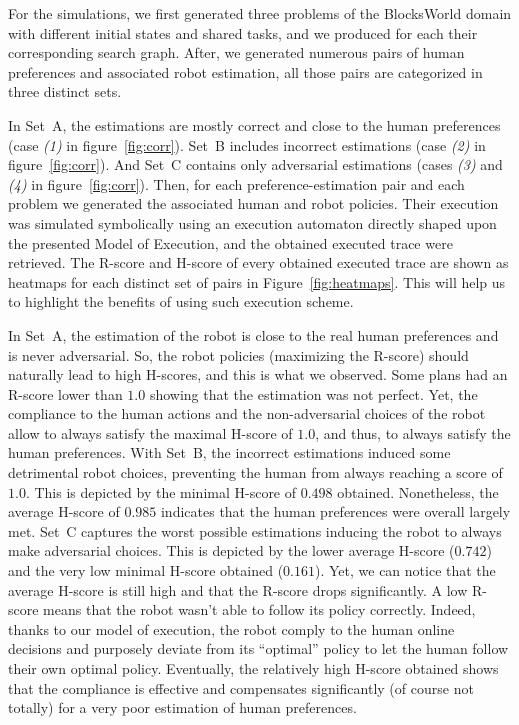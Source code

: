 For the simulations, we first generated three problems of the BlocksWorld domain with different initial states and shared tasks, and we produced for each their corresponding search graph. 
After, we generated numerous pairs of human preferences and associated robot estimation, all those pairs are categorized in three distinct sets.

In Set~A, the estimations are mostly correct and close to the human preferences (case \textit{(1)} in figure~\ref{fig:corr}). Set~B includes incorrect estimations (case \textit{(2)} in figure~\ref{fig:corr}). And Set~C contains only adversarial estimations (cases \textit{(3)} and \textit{(4)} in figure~\ref{fig:corr}).
Then, for each preference-estimation pair and each problem we generated the associated human and robot policies. Their execution was simulated symbolically using an execution automaton directly shaped upon the presented Model of Execution, and the obtained executed trace were retrieved.
The R-score and H-score of every obtained executed trace are shown as heatmaps for each distinct set of pairs in Figure~\ref{fig:heatmaps}. This will help us to highlight the benefits of using such execution scheme.

In Set~A, the estimation of the robot is close to the real human preferences and is never adversarial. So, the robot policies (maximizing the R-score) should naturally lead to high H-scores, and this is what we observed.
Some plans had an R-score lower than $1.0$ showing that the estimation was not perfect. Yet, the compliance to the human actions and the non-adversarial choices of the robot allow to always satisfy the maximal H-score of $1.0$, and thus, to always satisfy the human preferences. 
With Set~B, the incorrect estimations induced some detrimental robot choices, preventing the human from always reaching a score of $1.0$. This is depicted by the minimal H-score of $0.498$ obtained. Nonetheless, the average H-score of $0.985$ indicates that the human preferences were overall largely met.
Set~C captures the worst possible estimations inducing the robot to always make adversarial choices. This is depicted by the lower average H-score ($0.742$) and the very low minimal H-score obtained ($0.161$). 
Yet, we can notice that the average H-score is still high and that the R-score drops significantly. A low R-score means that the robot wasn't able to follow its policy correctly. Indeed, thanks to our model of execution, the robot comply to the human online decisions and purposely deviate from its ``optimal'' policy to let the human follow their own optimal policy. Eventually, the relatively high H-score obtained shows that the compliance is effective and compensates significantly (of course not totally) for a very poor estimation of human preferences. 

